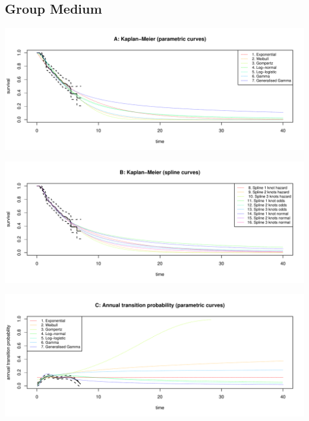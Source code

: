 \documentclass[
]{article}
\begin{document}
\clearpage

\hypertarget{group-medium}{%
\subsection{Group Medium}\label{group-medium}}

\begin{flushleft}\includegraphics[height=0.29\textheight]{Images/validate_extrapolation2-1} \end{flushleft}

\begin{flushleft}\includegraphics[height=0.29\textheight]{Images/validate_extrapolation2-2} \end{flushleft}

\begin{flushleft}\includegraphics[height=0.29\textheight]{Images/validate_extrapolation2-3} \end{flushleft}
\end{document}
